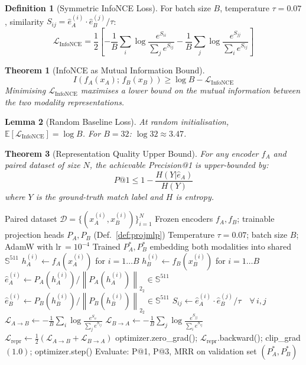 \documentclass[12pt,a4paper]{article}
\theoremstyle{definition}
\newtheorem{definition}{Definition}[section]
\theoremstyle{plain}
\newtheorem{theorem}{Theorem}[section]
\newtheorem{lemma}[theorem]{Lemma}
\theoremstyle{remark}
\newcommand{\Sph}{\mathbb{S}}
\newcommand{\Norm}[1]{\left\|#1\right\|_2}
\newcommand{\EE}{\mathbb{E}}
\begin{document}
\begin{definition}[Symmetric InfoNCE Loss]
For batch size $B$, temperature $\tau = 0.07$, similarity $S_{ij} = \hat{e}_A^{(i)} \cdot \hat{e}_B^{(j)} / \tau$:
\[
  \mathcal{L}_{\text{InfoNCE}} = \frac{1}{2}\left[
    -\frac{1}{B}\sum_i \log\frac{e^{S_{ii}}}{\sum_j e^{S_{ij}}}
    -\frac{1}{B}\sum_j \log\frac{e^{S_{jj}}}{\sum_i e^{S_{ij}}}
  \right]
\]
\end{definition}

\begin{theorem}[InfoNCE as Mutual Information Bound]
\[
  I(f_A(x_A);\, f_B(x_B)) \ge \log B - \mathcal{L}_{\text{InfoNCE}}
\]
Minimising $\mathcal{L}_{\text{InfoNCE}}$ maximises a lower bound on the mutual information between the two modality representations.
\end{theorem}

\begin{lemma}[Random Baseline Loss]
At random initialisation, $\EE[\mathcal{L}_{\text{InfoNCE}}] = \log B$. For $B = 32$: $\log 32 \approx 3.47$.
\end{lemma}

\begin{theorem}[Representation Quality Upper Bound]
For any encoder $f_A$ and paired dataset of size $N$, the achievable Precision@1 is upper-bounded by:
\[
  P@1 \le 1 - \frac{H(Y|\hat{e}_A)}{H(Y)}
\]
where $Y$ is the ground-truth match label and $H$ is entropy.
\end{theorem}

\begin{algorithm}[H]
\caption{Challenge 1 — Multimodal Representation Learning (Coordinated Embedding)}
\label{alg:repr_challenge}
\begin{algorithmic}[1]
\Require Paired dataset $\mathcal{D} = \{(x_A^{(i)}, x_B^{(i)})\}_{i=1}^N$
\Require Frozen encoders $f_A, f_B$; trainable projection heads $P_A, P_B$ (Def.~\ref{def:projmlp})
\Require Temperature $\tau = 0.07$; batch size $B$; AdamW with lr\,$= 10^{-4}$
\Ensure Trained $P_A^*, P_B^*$ embedding both modalities into shared $\Sph^{511}$
    \State $h_A^{(i)} \gets f_A(x_A^{(i)})$ for $i=1\ldots B$ 
    \State $h_B^{(i)} \gets f_B(x_B^{(i)})$ for $i=1\ldots B$
    \State $\hat{e}_A^{(i)} \gets P_A(h_A^{(i)}) / \Norm{P_A(h_A^{(i)})}_2 \in \Sph^{511}$
    \State $\hat{e}_B^{(i)} \gets P_B(h_B^{(i)}) / \Norm{P_B(h_B^{(i)})}_2 \in \Sph^{511}$
    \State $S_{ij} \gets \hat{e}_A^{(i)} \cdot \hat{e}_B^{(j)} / \tau \quad \forall\, i,j$ 
    \State $\mathcal{L}_{A \to B} \gets -\frac{1}{B}\sum_i \log\frac{e^{S_{ii}}}{\sum_j e^{S_{ij}}}$
    \State $\mathcal{L}_{B \to A} \gets -\frac{1}{B}\sum_j \log\frac{e^{S_{jj}}}{\sum_i e^{S_{ij}}}$
    \State $\mathcal{L}_{\text{repr}} \gets \frac{1}{2}(\mathcal{L}_{A \to B} + \mathcal{L}_{B \to A})$
    \State optimizer.zero\_grad(); $\mathcal{L}_{\text{repr}}$.backward(); clip\_grad$(1.0)$; optimizer.step()
  \EndFor
  \State Evaluate: P@1, P@3, MRR on validation set
\EndFor
\State \Return $(P_A^*, P_B^*)$
\end{algorithmic}
\end{algorithm}
\end{document}
